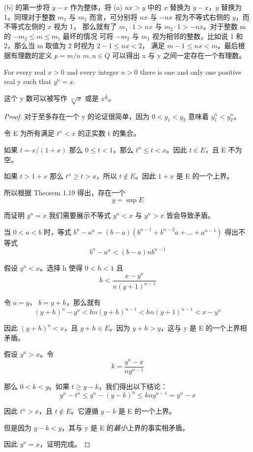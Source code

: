 \documentclass[../poma-notes.tex]{subfiles}
\begin{document}
\anote
(b) 的第一步将 $y-x$ 作为整体，将 (a) $nx > y$ 中的 $x$ 替换为 $y-x$，$y$ 替换为 1。同理对于整数
$m_1$ 与 $m_2$ 而言，可分别将 $nx$ 与 $-nx$ 视为不等式右侧的 $y$，而不等式左侧的 $x$ 视为 1，
那么就有了 $m_1 \cdot 1 > nx$ 与 $m_2 \cdot 1 > -nx$。对于整数 m 的 $-m_2 \le m \le m_1$ 最坏的情况
可将 $-m_2$ 与 $m_1$ 视为相邻的整数，比如说 1 和 2，那么当 m 取值为 2 时视为 $2 - 1 \le nx < 2$，
满足 $m - 1 \le nx < m$。最后根据有理数的定义 $p=m/n$ $m,n \in Q$ 可以得出 x 与 y 之间一定存在一个有理数。

\begin{theorem}
	For every real $x>0$ and every integer $n>0$ there is one and only one positive real y such that
	$y^n=x$.
\end{theorem}

这个 y 数可以被写作 $\sqrt[n]{x}$ 或是 $x^\frac{1}{n}$。

\begin{proof}
	对于至多存在一个 y 的论证很简单，因为 $0 < y_1 < y_2$ 意味着 $y^n_1 < y^n_2$。

	令 E 为所有满足 $t^n < x$ 的正实数 t 的集合。

	如果 $t = x/(1+x)$ 那么 $0 \le t < 1$，那么 $t^n \le t < x$。因此 $t \in E$，且 E 不为空。

	如果 $t>1+x$ 那么 $t^n \ge t > x$，所以 $t \notin E$。因此 $1+x$ 是 E 的一个上界。

	所以根据 Theorem 1.19 得出，存在一个
	\[ y = \sup E\]

	而证明 $y^n = x$ 我们需要展示不等式 $y^n < x$ 与 $y^n > x$ 皆会导致矛盾。

	当  $0<a<b$ 时，等式 $b^n - a^n = (b-a)(b^{n-1} + b^{n-2}a + \dots + a^{n-1})$ 得出不等式
	\[b^n - a^n < (b-a)nb^{n-1}\]

	假设 $y^n<x$。选择 h 使得 $0<h<1$ 且
	\[h < \frac{x-y^n}{n(y+1)^{n-1}}\]

	令 $a=y$， $b=y+h$，那么就有
	\[(y+h)^n-y^n < hn(y+h)^{n-1} < hn(y+1)^{n-1} < x-y^n\]

	因此 $(y+h)^n < x$，且 $y+h \in E$。因为 $y+h>y$，这与 y 是 E 的一个上界相矛盾。

	假设 $y^n>x$。令
	\[k=\frac{y^n-x}{ny^{n-1}}\]

	那么 $0<k<y$。如果 $t \ge y-k$，我们得出以下结论：
	\[y^n - t^n \le y^n - (y - k)^n \le kny^{n-1} = y^n - x\]

	因此 $t^n > x$，且 $t \notin E$。它遵循 $y - k$ 是 E 的一个上界。

	但是因为 $y-k<y$，其与 y 是 E 的\textit{最小}上界的事实相矛盾。

	因此 $y^n=x$，证明完成。
\end{proof}
\end{document}
